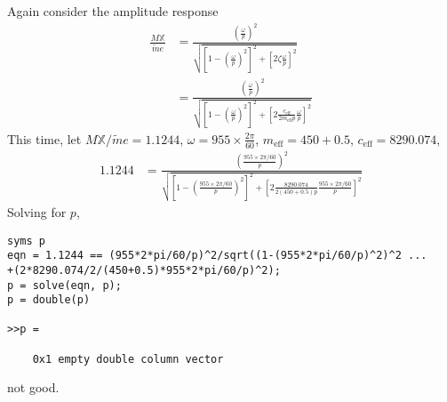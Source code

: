 \subsubsection{}
Again consider the amplitude response
\begin{align*}
    \frac{M \mathbb{X}}{\tilde{m} e} &= \frac{\left(\frac{\omega}{p}\right)^2}{\sqrt{\left[1 - \left(\frac{\omega}{p}\right)^2\right]^2 + \left[2 \zeta \frac{\omega}{p}\right]^2}} \\
    &= \frac{\left(\frac{\omega}{p}\right)^2}{\sqrt{\left[1 - \left(\frac{\omega}{p}\right)^2\right]^2 + \left[2 \frac{c_{\text{eff}}}{2 m_{\text{eff}} p} \frac{\omega}{p}\right]^2}}
\end{align*}
This time, let $M \mathbb{X}/\tilde{m} e = 1.1244$, $\omega = 955 \times \frac{2\pi}{60}$, $m_{\text{eff}} = 450 + 0.5$, $c_{\text{eff}} = 8290.074$, 
\begin{align*}
    1.1244 &= \frac{\left(\frac{955 \times 2\pi/60}{p}\right)^2}{\sqrt{\left[1 - \left(\frac{955 \times 2\pi/60}{p}\right)^2\right]^2 + \left[2 \frac{8290.074}{2(450 + 0.5) p} \frac{955 \times 2\pi/60}{p}\right]^2}} 
\end{align*}
Solving for $p$,
\begin{verbatim}
syms p 
eqn = 1.1244 == (955*2*pi/60/p)^2/sqrt((1-(955*2*pi/60/p)^2)^2 ... 
+(2*8290.074/2/(450+0.5)*955*2*pi/60/p)^2);
p = solve(eqn, p);
p = double(p)

>>p =

    0x1 empty double column vector
\end{verbatim}
not good.